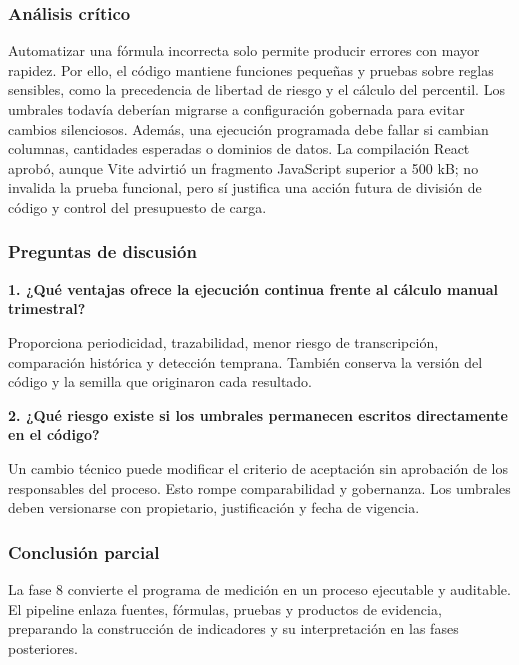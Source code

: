 \subsubsection{Análisis crítico}

Automatizar una fórmula incorrecta solo permite producir errores con mayor rapidez. Por ello, el código mantiene funciones pequeñas y pruebas sobre reglas sensibles, como la precedencia de libertad de riesgo y el cálculo del percentil. Los umbrales todavía deberían migrarse a configuración gobernada para evitar cambios silenciosos. Además, una ejecución programada debe fallar si cambian columnas, cantidades esperadas o dominios de datos. La compilación React aprobó, aunque Vite advirtió un fragmento JavaScript superior a 500 kB; no invalida la prueba funcional, pero sí justifica una acción futura de división de código y control del presupuesto de carga.

\subsubsection{Preguntas de discusión}

\textbf{1. ¿Qué ventajas ofrece la ejecución continua frente al cálculo manual trimestral?}

Proporciona periodicidad, trazabilidad, menor riesgo de transcripción, comparación histórica y detección temprana. También conserva la versión del código y la semilla que originaron cada resultado.

\textbf{2. ¿Qué riesgo existe si los umbrales permanecen escritos directamente en el código?}

Un cambio técnico puede modificar el criterio de aceptación sin aprobación de los responsables del proceso. Esto rompe comparabilidad y gobernanza. Los umbrales deben versionarse con propietario, justificación y fecha de vigencia.

\subsubsection{Conclusión parcial}

La fase 8 convierte el programa de medición en un proceso ejecutable y auditable. El pipeline enlaza fuentes, fórmulas, pruebas y productos de evidencia, preparando la construcción de indicadores y su interpretación en las fases posteriores.

